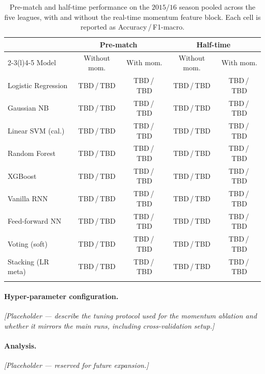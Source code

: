\documentclass[pdflatex,sn-mathphys-num]{sn-jnl}
\theoremstyle{thmstyleone}
\theoremstyle{thmstyletwo}
\theoremstyle{thmstylethree}
\begin{document}
\begin{table}[h]
\caption{Pre-match and half-time performance on the $2015/16$
season pooled across the five leagues, with and without the
real-time momentum feature block. Each cell is reported as
Accuracy\,/\,F1-macro.}\label{tab:mom-overview}
\footnotesize
\begin{tabular*}{\textwidth}{@{\extracolsep\fill}l cc cc@{}}
\toprule
 & \multicolumn{2}{c}{\textbf{Pre-match}} & \multicolumn{2}{c}{\textbf{Half-time}} \\
\cmidrule(r){2-3}\cmidrule(l){4-5}
Model               & Without mom. & With mom. & Without mom. & With mom. \\
\midrule
Logistic Regression & TBD\,/\,TBD & TBD\,/\,TBD & TBD\,/\,TBD & TBD\,/\,TBD \\
Gaussian NB         & TBD\,/\,TBD & TBD\,/\,TBD & TBD\,/\,TBD & TBD\,/\,TBD \\
Linear SVM (cal.)   & TBD\,/\,TBD & TBD\,/\,TBD & TBD\,/\,TBD & TBD\,/\,TBD \\
Random Forest       & TBD\,/\,TBD & TBD\,/\,TBD & TBD\,/\,TBD & TBD\,/\,TBD \\
XGBoost             & TBD\,/\,TBD & TBD\,/\,TBD & TBD\,/\,TBD & TBD\,/\,TBD \\
Vanilla RNN         & TBD\,/\,TBD & TBD\,/\,TBD & TBD\,/\,TBD & TBD\,/\,TBD \\
Feed-forward NN     & TBD\,/\,TBD & TBD\,/\,TBD & TBD\,/\,TBD & TBD\,/\,TBD \\
\midrule
Voting (soft)       & TBD\,/\,TBD & TBD\,/\,TBD & TBD\,/\,TBD & TBD\,/\,TBD \\
Stacking (LR meta)  & TBD\,/\,TBD & TBD\,/\,TBD & TBD\,/\,TBD & TBD\,/\,TBD \\
\botrule
\end{tabular*}
\end{table}

\paragraph{Hyper-parameter configuration.}
\emph{[Placeholder --- describe the tuning protocol used for the
momentum ablation and whether it mirrors the main runs, including
cross-validation setup.]}

\paragraph{Analysis.}
\emph{[Placeholder --- reserved for future expansion.]}
\end{document}
